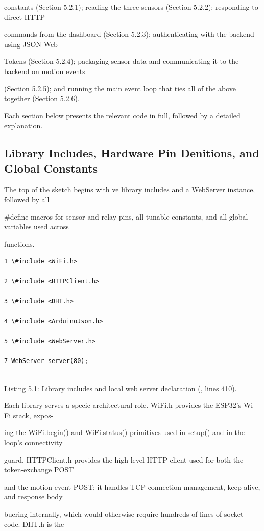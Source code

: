 constants (Section 5.2.1); reading the three sensors (Section 5.2.2); responding to direct HTTP

commands from the dashboard (Section 5.2.3); authenticating with the backend using JSON Web

Tokens (Section 5.2.4); packaging sensor data and communicating it to the backend on motion events

(Section 5.2.5); and running the main event loop that ties all of the above together (Section 5.2.6).

Each section below presents the relevant code in full, followed by a detailed explanation.


\subsection{Library Includes, Hardware Pin Denitions, and Global Constants}
The top of the sketch begins with ve library includes and a WebServer instance, followed by all

\#define macros for sensor and relay pins, all tunable constants, and all global variables used across

functions.

\begin{listingbox}
	\begin{verbatim}
1 \#include <WiFi.h>

2 \#include <HTTPClient.h>

3 \#include <DHT.h>

4 \#include <ArduinoJson.h>

5 \#include <WebServer.h>

7 WebServer server(80);


\end{verbatim}
\end{listingbox}
Listing 5.1: Library includes and local web server declaration (, lines 410).

Each library serves a specic architectural role. WiFi.h provides the ESP32's Wi-Fi stack, expos-

ing the WiFi.begin() and WiFi.status() primitives used in setup() and in the loop's connectivity

guard. HTTPClient.h provides the high-level HTTP client used for both the token-exchange POST

and the motion-event POST; it handles TCP connection management, keep-alive, and response body

buering internally, which would otherwise require hundreds of lines of socket code. DHT.h is the

